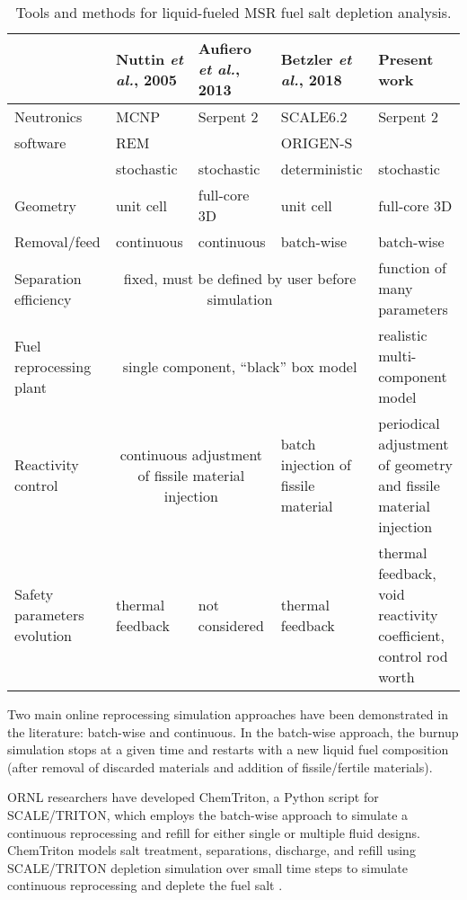 \begin{table}[htbp]
	\fontsize{9}{11}\selectfont
	\caption{Tools and methods for liquid-fueled \gls{MSR} fuel salt 	
	depletion analysis.}
	\begin{tabularx}{\textwidth}{p{} p{} 	
	p{} p{} p{}} 
	\hline
	&Nuttin \emph{et al.}, 2005 \cite{nuttin_potential_2005}& Aufiero 
	\emph{et al.}, 2013 \cite{aufiero_extended_2013} & Betzler \emph{et al.}, 
	2018 \cite{betzler_fuel_2018}&Present work \\ \hline
	Neutronics&\gls{MCNP}&Serpent 2 &SCALE6.2     &Serpent 2 \\
	software  & REM      &          &ORIGEN-S     &			       \\
         	  &stochastic&stochastic&deterministic&stochastic      \\[10pt]
	Geometry  & unit cell& full-core 3D&unit cell&full-core 3D\\      [10pt]
	Removal/feed  & continuous &continuous & batch-wise & batch-wise\\[10pt]
	Separation efficiency &\multicolumn{3}{c}{fixed, must be defined by 
	user before simulation} & function of many para\-me\-ters \\ [10pt]
	Fuel reprocessing plant & \multicolumn{3}{c}{single component, 	``black'' 
	box model} & realistic multi-compo\-nent model \\ [10pt]
	Reactivity control & \multicolumn{2}{c}{continuous adjustment of fissile 
	material injection} & batch injection of fissile material & periodical 
		adjustment of geometry and fissile material injection\\ [10pt]
	Safety parameters evolution & thermal feedback & not considered & thermal 
	feedback & thermal feedback, void reactivity coefficient, control rod 
	worth \\
	\hline
	\end{tabularx}
	\label{tab:msr_codes}
\end{table}

Two main online reprocessing simulation approaches have been demonstrated in 
the literature: batch-wise and continuous. In the batch-wise approach, the 
burnup simulation stops at a given time and restarts with a new liquid fuel 
composition (after removal of discarded materials and addition of 
fissile/fertile materials). 

\gls{ORNL} researchers have developed ChemTriton, a Python script for
SCALE/TRITON, which employs the batch-wise approach to simulate a continuous 
reprocessing and refill for either single or multiple fluid designs.  
ChemTriton models salt treatment, separations, discharge, and refill using  
SCALE/TRITON depletion simulation over small time steps to simulate continuous 
reprocessing and deplete the fuel salt \cite{betzler_fuel_2018, 
powers_new_2013}.

